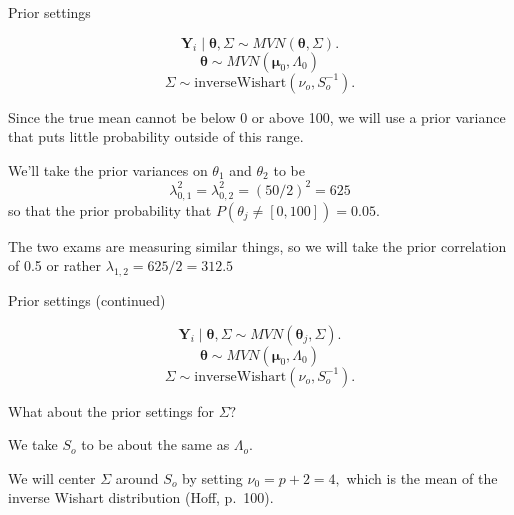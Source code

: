 \documentclass[
  ignorenonframetext,
]{beamer}
\newcommand{\btheta}{{\bm\theta}}
\begin{document}
\begin{frame}{Prior settings}
\protect\hypertarget{prior-settings-1}{}

\[\bm{Y}_i \mid \bm{\theta}, \Sigma \sim MVN(\bm{\theta}, \Sigma).\]
\[ \bm{\theta} \sim MVN(\bm{\mu}_0, \Lambda_0)\]
\[ \Sigma \sim \text{inverseWishart}(\nu_o, S_o^{-1}).\]

Since the true mean cannot be below 0 or above 100, we will use a prior
variance that puts little probability outside of this range.

We'll take the prior variances on \(\theta_1\) and \(\theta_2\) to be
\[\lambda_{0,1}^2 = \lambda_{0,2}^2 = (50/2)^2 = 625\] so that the prior
probability that \(P(\theta_j \neq [0,100]) =0.05.\)

The two exams are measuring similar things, so we will take the prior
correlation of 0.5 or rather \(\lambda_{1,2} = 625/2 = 312.5\)

\end{frame}

\begin{frame}{Prior settings (continued)}
\protect\hypertarget{prior-settings-continued}{}

\[\bm{Y}_i \mid \bm{\theta}, \Sigma \sim MVN(\btheta_j, \Sigma).\]
\[ \bm{\theta} \sim MVN(\bm{\mu}_0, \Lambda_0)\]
\[ \Sigma \sim \text{inverseWishart}(\nu_o, S_o^{-1}).\]

What about the prior settings for \(\Sigma?\)

We take \(S_o\) to be about the same as \(\Lambda_o.\)

We will center \(\Sigma\) around \(S_o\) by setting
\(\nu_0 = p + 2 = 4,\) which is the mean of the inverse Wishart
distribution (Hoff, p.~100).

\end{frame}
\end{document}
